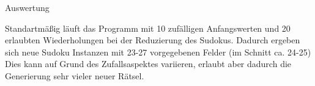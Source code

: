 \begin{Large}
    Auswertung
\end{Large}
\vspace{2ex}

Standartmäßig läuft das Programm mit 10 zufälligen Anfangswerten und 20 erlaubten Wiederholungen bei der Reduzierung des Sudokus.
Dadurch ergeben sich neue Sudoku Instanzen mit 23-27 vorgegebenen Felder (im Schnitt ca. 24-25) Dies kann auf Grund des Zufallsaspektes variieren, erlaubt aber dadurch die Generierung sehr vieler neuer Rätsel.



